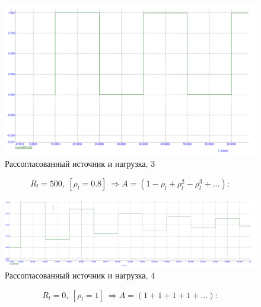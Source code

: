 \documentclass[a4paper, 14pt]{extarticle}%
\begin{document}
\begin{figure}[h!]
			\centering
			\includegraphics[width=1.1\linewidth]{./graphs/16.jpg}
			\caption{Рассогласованный источник и нагрузка, 3}
			\label{4.3}
\end{figure}

\[R_{l}=500,\ \left[\rho_{l}=0.8\right] \ \Rightarrow A=\left(1-\rho_{l}+\rho_{l}^{2}-\rho_{l}^{3}+\ldots\right):\]

\begin{figure}[h!]
			\centering
			\includegraphics[width=1.1\linewidth]{./graphs/17.jpg}
			\caption{Рассогласованный источник и нагрузка, 4}
			\label{4.4}
\end{figure}

\[R_{l}=0,\ \left[\rho_{l}=1\right] \ \Rightarrow A=(1+1+1+1+\ldots): \]

\newpage
\end{document}
